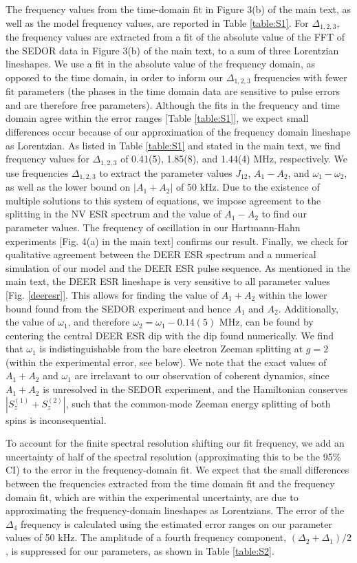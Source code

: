 \documentclass[%
 reprint,
 amsmath,amssymb,
 aps,
]{revtex4-1}
\begin{document}
The frequency values from the time-domain fit in Figure 3(b) of the main text, as well as the model frequency values, are reported in Table \ref{table:S1}. For $\Delta_{1,2,3}$, the frequency values are extracted from a fit of the absolute value of the FFT of the SEDOR data in Figure 3(b) of the main text, to a sum of three Lorentzian lineshapes. We use a fit in the absolute value of the frequency domain, as opposed to the time domain, in order to inform our $\Delta_{1,2,3}$ frequencies with fewer fit parameters (the phases in the time domain data are sensitive to pulse errors and are therefore free parameters). Although the fits in the frequency and time domain agree within the error ranges [Table \ref{table:S1}], we expect small differences occur because of our approximation of the frequency domain lineshape as Lorentzian. As listed in Table \ref{table:S1} and stated in the main text, we find frequency values for $\Delta_{1,2,3}$ of 0.41(5), 1.85(8), and 1.44(4) MHz, respectively. We use frequencies $\Delta_{1,2,3}$ to extract the parameter values $J_{12}$, $A_1 - A_2$, and $\omega_1 - \omega_2$, as well as the lower bound on $|A_1+A_2|$ of 50 kHz. Due to the existence of multiple solutions to this system of equations, we impose agreement to the splitting in the NV ESR spectrum and the value of $A_1-A_2$ to find our parameter values. The frequency of oscillation in our Hartmann-Hahn experiments [Fig. 4(a) in the main text] confirms our result. Finally, we check for qualitative agreement between the DEER ESR spectrum and a numerical simulation of our model and the DEER ESR pulse sequence. As mentioned in the main text, the DEER ESR lineshape is very sensitive to all parameter values [Fig. \ref{deeresr}]. This allows for finding the value of $A_1 + A_2$ within the lower bound found from the SEDOR experiment and hence $A_1$ and $A_2$. Additionally, the value of $\omega_1$, and therefore $\omega_2 = \omega_1 - 0.14(5) \text{ MHz}$, can be found by centering the central DEER ESR dip with the dip found numerically. We find that $\omega_1$ is indistinguishable from the bare electron Zeeman splitting at $g=2$ (within the experimental error, see below). We note that the exact values of $A_1 + A_2$ and $\omega_1$ are irrelavant to our observation of coherent dynamics, since $A_1 + A_2$ is unresolved in the SEDOR experiment, and the Hamiltonian conserves $|S_z^{(1)} + S_z^{(2)}|$, such that the common-mode Zeeman energy splitting of both spins is inconsequential.

To account for the finite spectral resolution shifting our fit frequency, we add an uncertainty of half of the spectral resolution (approximating this to be the 95\% CI) to the error in the frequency-domain fit. We expect that the small differences between the frequencies extracted from the time domain fit and the frequency domain fit, which are within the experimental uncertainty, are due to approximating the frequency-domain lineshapes as Lorentzians. The error of the $\Delta_4$ frequency is calculated using the estimated error ranges on our parameter values of 50 kHz. The amplitude of a fourth frequency component, $(\Delta_{2} + \Delta_{1})/2$, is suppressed for our parameters, as shown in Table \ref{table:S2}.
\end{document}
